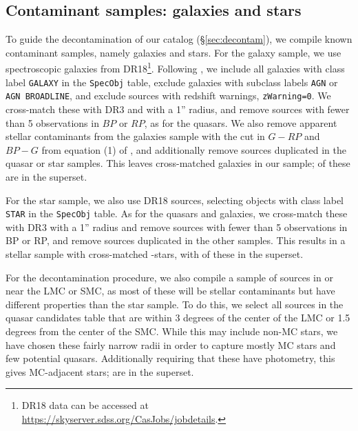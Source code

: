 \subsection{Contaminant samples: galaxies and stars}
\label{sec:data_contaminants}

To guide the decontamination of our catalog (\S\ref{sec:decontam}), we compile known contaminant samples, namely galaxies and stars.
For the galaxy sample, we use \SDSS spectroscopic galaxies from DR18\footnote{\SDSS DR18 data can be accessed at \url{https://skyserver.sdss.org/CasJobs/jobdetails}.}.
Following \citep{bailer-jones_dsc_2021}, we include all galaxies with class label \texttt{GALAXY} in the \texttt{SpecObj} table, exclude galaxies with subclass labels \texttt{AGN} or \texttt{AGN BROADLINE}, and exclude sources with redshift warnings, \texttt{zWarning=0}.
We cross-match these with \Gaia DR3 and \unWISE with a 1'' radius, and remove sources with fewer than 5 observations in $BP$ or $RP$, as for the \SDSS quasars.
We also remove apparent stellar contaminants from the galaxies sample with the cut in $G-RP$ and $BP-G$ from equation (1) of \cite{bailer-jones_quasar_2019}, and additionally remove sources duplicated in the \SDSS quasar or star samples.
This leaves  cross-matched \SDSS galaxies in our sample;  of these are in the \cat superset.

For the star sample, we also use \SDSS DR18 sources, selecting objects with class label \texttt{STAR} in the \texttt{SpecObj} table.
As for the quasars and galaxies, we cross-match these with \Gaia DR3 with a 1'' radius and remove sources with fewer than 5 observations in BP or RP, and remove sources duplicated in the other samples.
This results in a stellar sample with  cross-matched \SDSS-\Gaia stars, with  of these in the superset.

For the decontamination procedure, we also compile a sample of sources in or near the LMC or SMC, as most of these will be stellar contaminants but have different properties than the \SDSS star sample.
To do this, we select all sources in the \Gaia quasar candidates table that are within 3 degrees of the center of the LMC or 1.5 degrees from the center of the SMC.
While this may include non-MC stars, we have chosen these fairly narrow radii in order to capture mostly MC stars and few potential quasars.
Additionally requiring that these have \unWISE photometry, this gives  MC-adjacent stars;  are in the superset.


